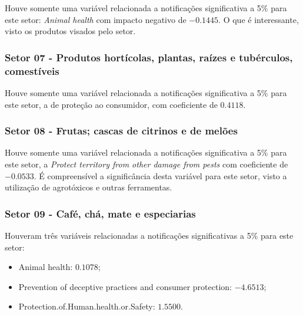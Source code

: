  

Houve somente uma variável relacionada a notificações significativa a 5\% para este setor: \emph{Animal health} com impacto negativo de $-0.1445$. O que é interessante, visto os produtos visados pelo setor.

\newpage

\subsubsection{Setor 07 - Produtos hortícolas, plantas, raízes e tubérculos, comestíveis}


 

Houve somente uma variável relacionada a notificações significativa a 5\% para este setor, a de proteção ao consumidor, com coeficiente de $0.4118$. 

\newpage

\subsubsection{Setor 08 - Frutas; cascas de citrinos e de melões}


 

Houve somente uma variável relacionada a notificações significativa a 5\% para este setor, a \emph{Protect territory from other damage from pests} com coeficiente de $-0.0533$. É compreensível a significância desta variável para este setor, visto a utilização de agrotóxicos e outras ferramentas.

\newpage

\subsubsection{Setor 09 - Café, chá, mate e especiarias}


 

Houveram três variáveis relacionadas a notificações significativas a 5\% para este setor: 
\begin{itemize}
    \item Animal health: $0.1078$;
    \item Prevention of deceptive practices and consumer protection: $-4.6513$;
    \item Protection.of.Human.health.or.Safety: $1.5500$.
\end{itemize}

